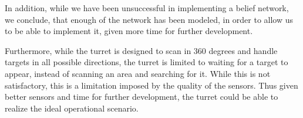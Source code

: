 In addition, while we have been unsuccessful in implementing a belief network,
we conclude, that enough of the network has been modeled, in order to allow us
to be able to implement it, given more time for further development.\nl

Furthermore, while the turret is designed to scan in 360 degrees and handle
targets in all possible directions, the turret is limited to waiting for a
target to appear, instead of scanning an area and searching for it. While this
is not satisfactory, this is a limitation imposed by the quality of the sensors.
Thus given better sensors and time for further development, the turret could be
able to realize the ideal operational scenario. \nl

